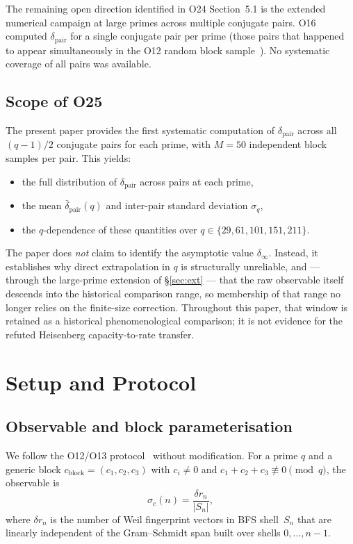 \documentclass[11pt,a4paper]{article}
\theoremstyle{definition}
\newcommand{\dpair}{\delta_{\mathrm{pair}}}
\newcommand{\dpairmean}{\bar{\delta}_{\mathrm{pair}}}
\begin{document}
      The remaining open direction identified in O24 Section~5.1 is the extended numerical
      campaign at large primes across multiple conjugate pairs.
      O16 computed $\dpair$ for a single conjugate pair per prime (those pairs that happened
      to appear simultaneously in the O12 random block sample~\cite{Beau2026a16}).
      No systematic coverage of all pairs was available.

    \subsection{Scope of O25}

      The present paper provides the first systematic computation of $\dpair$ across all
      $(q-1)/2$ conjugate pairs for each prime, with $M = 50$ independent block samples per
      pair.
      This yields:
      \begin{itemize}
        \item the full distribution of $\dpair$ across pairs at each prime,
        \item the mean $\dpairmean(q)$ and inter-pair standard deviation $\sigma_q$,
        \item the $q$-dependence of these quantities over $q \in \{29, 61, 101, 151, 211\}$.
      \end{itemize}

      The paper does \emph{not} claim to identify the asymptotic value $\delta_\infty$.
      Instead, it establishes why direct extrapolation in $q$ is structurally unreliable, and ---
      through the large-prime extension of \S\ref{sec:ext} --- that the raw observable itself
      descends into the historical comparison range, so membership of that range no longer
      relies on the finite-size correction.
      Throughout this paper, that window is retained as a historical phenomenological comparison;
      it is not evidence for the refuted Heisenberg capacity-to-rate transfer.

  \section{Setup and Protocol}

    \subsection{Observable and block parameterisation}

      We follow the O12/O13 protocol~\cite{Beau2026a16,Beau2026a17} without modification.
      For a prime $q$ and a generic block $c_{\mathrm{block}} = (c_1, c_2, c_3)$
      with $c_i \neq 0$ and $c_1 + c_2 + c_3 \not\equiv 0 \pmod{q}$, the observable is
      \begin{equation}
        \sigma_c(n) = \frac{\delta r_n}{|S_n|},
      \end{equation}
      where $\delta r_n$ is the number of Weil fingerprint vectors in BFS shell~$S_n$
      that are linearly independent of the Gram--Schmidt span built over shells
      $0, \ldots, n-1$.
\end{document}
